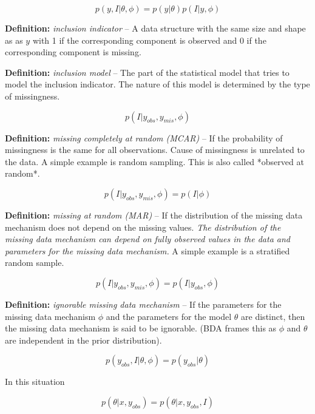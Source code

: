 \documentclass[11pt]{article}
\begin{document}
$$p(y, I|\theta, \phi) = p(y|\theta)p(I|y, \phi)$$

\vspace{0.25in}

\textbf{Definition:} \textit{inclusion indicator} -- A data structure with the same size and shape as as $y$ with 1 if the corresponding component is observed and 0 if the corresponding component is missing.

\vspace{0.25in}

\textbf{Definition:} \textit{inclusion model} -- The part of the statistical model that tries to model the inclusion indicator. The nature of this model is determined by the type of missingness. 

$$p(I|y_{obs}, y_{mis}, \phi)$$

\vspace{0.25in}

\textbf{Definition:} \textit{missing completely at random (MCAR)} -- If the probability of missingness is the same for all observations. Cause of missingness is unrelated to the data. A simple example is random sampling. This is also called *observed at random*.

$$p(I|y_{obs}, y_{mis}, \phi) = p(I| \phi)$$

\vspace{0.25in}

\textbf{Definition:} \textit{missing at random (MAR)} -- If the distribution of the missing data mechanism does not depend on the missing values. \textit{The distribution of the missing data mechanism can depend on fully observed values in the data and parameters for the missing data mechanism.} A simple example is a stratified random sample. 

$$p(I|y_{obs}, y_{mis}, \phi) = p(I|y_{obs}, \phi)$$

\vspace{0.25in}

\textbf{Definition:} \textit{ignorable missing data mechanism} -- If the parameters for the missing data mechanism $\phi$ and the parameters for the model $\theta$ are distinct, then the missing data mechanism is said to be ignorable. (BDA frames this as $\phi$ and $\theta$ are independent in the prior distribution). 

$$p(y_{obs},I|\theta, \phi) = p(y_{obs}|\theta)$$

In this situation

$$p(\theta|x, y_{obs}) = p(\theta|x, y_{obs}, I)$$
\end{document}
